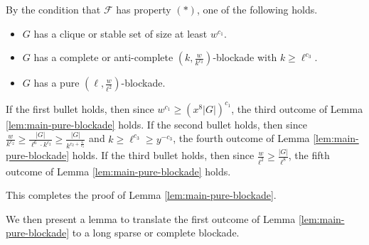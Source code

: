 \documentclass[a4paper,11pt]{article}
\let\oldendproof\endproof
\renewenvironment{proof}[1][\proofname]{%
	\oldproof[\normalfont\bfseries #1]%
}{\oldendproof}
\begin{document}
\begin{proof}
        By the condition that $\mathcal{F}$ has property $(*)$, one of the following holds. 

        \begin{itemize}
            
            \item $G$ has a clique or stable set of size at least $w^{c_1}$.
            
            \item $G$ has a complete or anti-complete $(k,\frac{w}{k^{c_2}})$-blockade with $k\geq \ell^{c_3}$.
            
            \item $G$ has a pure $(\ell,\frac{w}{\ell^{2}})$-blockade.
            
        \end{itemize} 
        
        If the first bullet holds, then since $w^{c_1}\geq (x^8|G|)^{c_1}$, the third outcome of Lemma \ref{lem:main-pure-blockade} holds.
        If the second bullet holds, then since $\frac{w}{k^{c_2}}\geq \frac{|G|}{\ell^6\cdot k^{c_2}}\geq \frac{|G|}{k^{c_2+\frac{6}{c_3}}}$ and $k\geq \ell^{c_3}\geq y^{-c_3}$, the fourth outcome of Lemma \ref{lem:main-pure-blockade} holds. 
        If the third bullet holds, then since $\frac{w}{\ell^2}\geq \frac{|G|}{\ell^8}$, the fifth outcome of Lemma \ref{lem:main-pure-blockade} holds. 

        This completes the proof of Lemma \ref{lem:main-pure-blockade}. 
    \end{proof}
    
    We then present a lemma to translate the first outcome of Lemma \ref{lem:main-pure-blockade} to a long sparse or complete blockade. 
\end{document}
